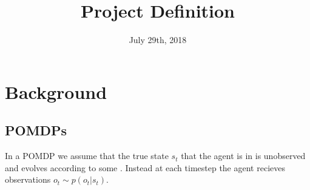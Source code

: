 \documentclass{article}
\title{Project Definition}
\date{July 29th, 2018}
\begin{document}
\maketitle

\section{Background}
    \subsection{POMDPs}
        In a POMDP we assume that the true state $s_t$ that the
        agent is in is unobserved and evolves according to some . Instead at each timestep the agent recieves
        observations $o_t \sim p(o_t | s_t)$.
\end{document}
